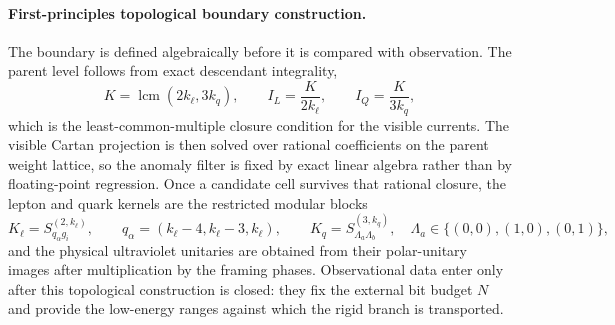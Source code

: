 \documentclass[11pt]{article}
\begin{document}
\paragraph{First-principles topological boundary construction.}
The boundary is defined algebraically before it is compared with observation. The parent level follows from exact descendant integrality,
\begin{equation}
 K=\operatorname{lcm}(2k_{\ell},3k_q),
 \qquad
 I_L=\frac{K}{2k_{\ell}},
 \qquad
 I_Q=\frac{K}{3k_q},
\end{equation}
which is the least-common-multiple closure condition for the visible currents. The visible Cartan projection is then solved over rational coefficients on the parent weight lattice, so the anomaly filter is fixed by exact linear algebra rather than by floating-point regression. Once a candidate cell survives that rational closure, the lepton and quark kernels are the restricted modular blocks
\begin{equation}
 K_{\ell}=S^{(2,k_{\ell})}_{q_{\alpha}g_i},
 \qquad
 q_{\alpha}=(k_{\ell}-4,k_{\ell}-3,k_{\ell}),
 \qquad
 K_q=S^{(3,k_q)}_{\Lambda_a\Lambda_b},
 \quad
 \Lambda_a\in\{(0,0),(1,0),(0,1)\},
\end{equation}
and the physical ultraviolet unitaries are obtained from their polar-unitary images after multiplication by the framing phases. Observational data enter only after this topological construction is closed: they fix the external bit budget $N$ and provide the low-energy ranges against which the rigid branch is transported.
\end{document}
